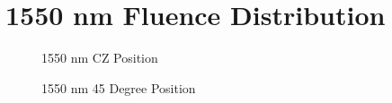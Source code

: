 \documentclass[journal,twoside,web]{ieeecolor}
\begin{document}
\section{1550 nm Fluence Distribution}
\label{app:1550Simulations}
\begin{figure}[htb!]
    \caption{\label{fig:1550-CZ} 1550 nm CZ Position}
\end{figure}

\begin{figure}[htb!]
    \caption{\label{fig:1550-45} 1550 nm 45 Degree Position}
\end{figure}
\end{document}
